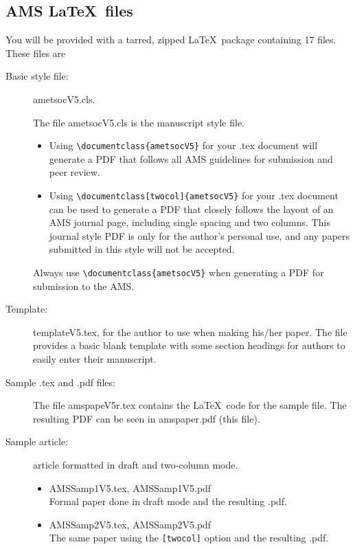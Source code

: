 \documentclass{ametsocV5}
\begin{document}
\appendix[B]

\subsection{AMS \LaTeX\ files}
You will be provided with a tarred, zipped \LaTeX\ package containing 
17 files. These files are

\begin{description}
\item[Basic style file:] ametsocV5.cls. 

The file ametsocV5.cls is the manuscript style file.  

\begin{itemize}
\item
Using \verb+\documentclass{ametsocV5}+ for your .tex document
will 
generate a PDF that follows all AMS guidelines for submission and peer
review.  

\item
Using \verb+\documentclass[twocol]{ametsocV5}+ for your .tex document
can be used to generate a PDF that closely
follows the layout of an AMS journal page, including single spacing and two
columns.  This journal style PDF is only for the author's personal use, and
any papers submitted in this style will not be accepted.  
\end{itemize}
Always use \verb+\documentclass{ametsocV5}+ 
when generating a PDF for submission to the AMS. 

\item[Template:]
templateV5.tex, for the author to use when making his/her
paper.
The file provides a basic blank template with some
section headings for authors to easily enter their manuscript.

\item[Sample .tex and .pdf files:]
The file amspapeV5r.tex contains the \LaTeX\ code for the sample file.  
The resulting PDF can be seen in amspaper.pdf (this file).


\item[Sample article:] article formatted in draft and two-column mode.

\begin{itemize}
\item
AMSSamp1V5.tex, AMSSamp1V5.pdf\\
Formal paper done in draft mode and the resulting .pdf.

\item
AMSSamp2V5.tex, AMSSamp2V5.pdf \\
The same paper using the \verb+[twocol]+ option and the resulting .pdf.


\end{itemize}
\end{description}
\end{document}

